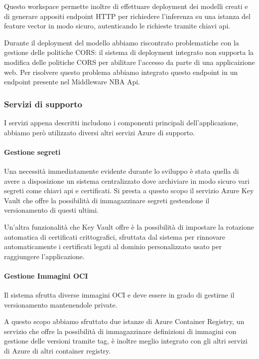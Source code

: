 Questo workspace permette inoltre di effettuare deployment dei modelli creati e di generare appositi endpoint HTTP per richiedere l'inferenza su una istanza del feature vector in modo sicuro, autenticando le richieste tramite chiavi api.

Durante il deployment del modello abbiamo riscontrato problematiche con la gestione delle politiche CORS: il sistema di deployment integrato non supporta la modifica delle politiche CORS per abilitare l'accesso da parte di una applicaizione web. Per risolvere questo problema abbiamo integrato questo endpoint in un endpoint presente nel Middleware NBA Api.

\subsubsection{Servizi di supporto}
I servizi appena descritti includono i componenti principali dell'applicazione, abbiamo però utilizzato diversi altri servizi Azure di supporto.

\paragraph{Gestione segreti} 
Una necessità immediatamente evidente durante lo sviluppo è stata quella di avere a disposizione un sistema centralizzato dove archiviare in modo sicuro vari segreti come chiavi api e certificati. Si presta a questo scopo il servizio Azure Key Vault che offre la possibilità di immagazzinare segreti gestendone il versionamento di questi ultimi.

Un'altra funzionalità che Key Vault offre è la possibilità di impostare la rotazione automatica di certificati crittografici, sfruttata dal sistema per rinnovare automaticamente i certificati legati al dominio personalizzato usato per raggiungere l'applicazione.

\paragraph{Gestione Immagini OCI}
Il sistema sfrutta diverse immagini OCI e deve essere in grado di gestirne il versionamento mantenendole private.

A questo scopo abbiamo sfruttato due istanze di Azure Container Registry, un servizio che offre la possibilità di immagazzinare definizioni di immagini con gestione delle versioni tramite tag, è inoltre meglio integrato con gli altri servizi di Azure di altri container registry.

